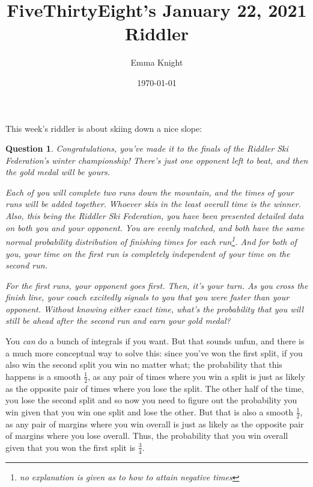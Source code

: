 \documentclass[11pt]{article}
\title{FiveThirtyEight's January 22, 2021 Riddler}
\author{Emma Knight}
\date{\today}
\newtheorem{question}[theorem]{Question}
\theoremstyle{definition}
\begin{document}
\maketitle
This week's riddler is about skiing down a nice slope:
\begin{question}
Congratulations, you’ve made it to the finals of the Riddler Ski Federation’s winter championship! There’s just one opponent left to beat, and then the gold medal will be yours.

Each of you will complete two runs down the mountain, and the times of your runs will be added together. Whoever skis in the least overall time is the winner. Also, this being the Riddler Ski Federation, you have been presented detailed data on both you and your opponent. You are evenly matched, and both have the same normal probability distribution of finishing times for each run\footnote{no explanation is given as to how to attain negative times}. And for both of you, your time on the first run is completely independent of your time on the second run.

For the first runs, your opponent goes first. Then, it’s your turn. As you cross the finish line, your coach excitedly signals to you that you were faster than your opponent. Without knowing either exact time, what’s the probability that you will still be ahead after the second run and earn your gold medal?
\end{question}
You \emph{can} do a bunch of integrals if you want.  But that sounds unfun, and there is a much more conceptual way to solve this: since you've won the first split, if you also win the second split you win no matter what; the probability that this happens is a smooth $\frac{1}{2}$, as any pair of times where you win a split is just as likely as the opposite pair of times where you lose the split.  The other half of the time, you lose the second split and so now you need to figure out the probability you win given that you win one split and lose the other.  But that is also a smooth $\frac{1}{2}$, as any pair of margins where you win overall is just as likely as the opposite pair of margins where you lose overall.  Thus, the probability that you win overall given that you won the first split is $\frac{3}{4}$.
\end{document}
